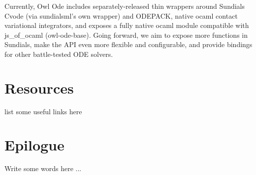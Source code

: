 Currently, Owl Ode includes separately-released thin wrappers around Sundials Cvode (via sundialsml's own wrapper) and ODEPACK, native ocaml contact variational integrators, and exposes a fully native ocaml module compatible with js\_of\_ocaml (owl-ode-base). Going forward, we aim to expose more functions in Sundials, make the API even more flexible and configurable, and provide bindings for other battle-tested ODE solvers.

\newpage



\hypertarget{Resources}{%
\section{Resources}\label{resources}}

list some useful links here

\newpage



\hypertarget{Epilogue}{%
\section{Epilogue}\label{epilogue}}

Write some words here ...